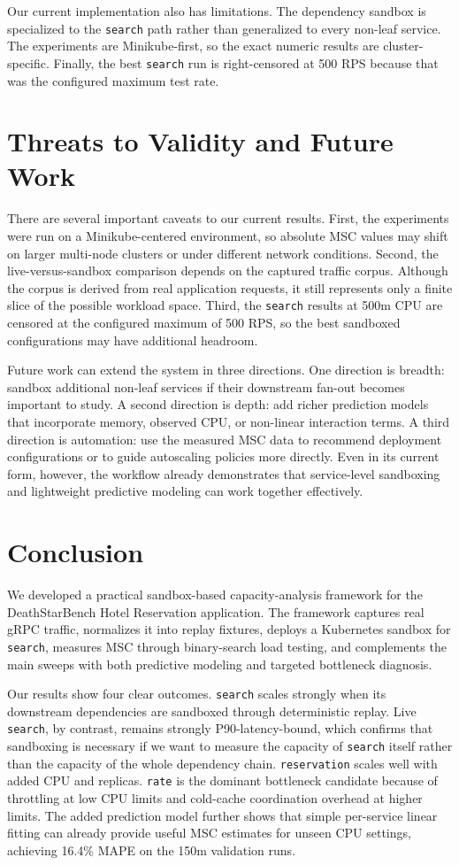 \documentclass[conference]{IEEEtran}
\begin{document}
Our current implementation also has limitations. The dependency sandbox is specialized to the \texttt{search} path rather than generalized to every non-leaf service. The experiments are Minikube-first, so the exact numeric results are cluster-specific. Finally, the best \texttt{search} run is right-censored at 500 RPS because that was the configured maximum test rate.

\section{Threats to Validity and Future Work}
There are several important caveats to our current results. First, the experiments were run on a Minikube-centered environment, so absolute MSC values may shift on larger multi-node clusters or under different network conditions. Second, the live-versus-sandbox comparison depends on the captured traffic corpus. Although the corpus is derived from real application requests, it still represents only a finite slice of the possible workload space. Third, the \texttt{search} results at 500m CPU are censored at the configured maximum of 500 RPS, so the best sandboxed configurations may have additional headroom.

Future work can extend the system in three directions. One direction is breadth: sandbox additional non-leaf services if their downstream fan-out becomes important to study. A second direction is depth: add richer prediction models that incorporate memory, observed CPU, or non-linear interaction terms. A third direction is automation: use the measured MSC data to recommend deployment configurations or to guide autoscaling policies more directly. Even in its current form, however, the workflow already demonstrates that service-level sandboxing and lightweight predictive modeling can work together effectively.

\section{Conclusion}
We developed a practical sandbox-based capacity-analysis framework for the DeathStarBench Hotel Reservation application. The framework captures real gRPC traffic, normalizes it into replay fixtures, deploys a Kubernetes sandbox for \texttt{search}, measures MSC through binary-search load testing, and complements the main sweeps with both predictive modeling and targeted bottleneck diagnosis.

Our results show four clear outcomes. \texttt{search} scales strongly when its downstream dependencies are sandboxed through deterministic replay. Live \texttt{search}, by contrast, remains strongly P90-latency-bound, which confirms that sandboxing is necessary if we want to measure the capacity of \texttt{search} itself rather than the capacity of the whole dependency chain. \texttt{reservation} scales well with added CPU and replicas. \texttt{rate} is the dominant bottleneck candidate because of throttling at low CPU limits and cold-cache coordination overhead at higher limits. The added prediction model further shows that simple per-service linear fitting can already provide useful MSC estimates for unseen CPU settings, achieving 16.4\% MAPE on the 150m validation runs.
\end{document}
